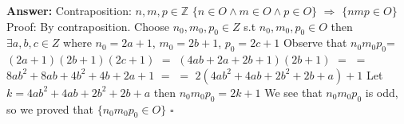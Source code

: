 \documentclass[12pt]{article}
\begin{document}
{\noindent\bf Answer:}
{
Contraposition: $n,m,p\in\mathbb{Z}$  $\{n \in O \land m \in O \land p \in O\}$ $\Rightarrow$  $\{nmp\in O\}$ \newline
Proof: By contraposition. Choose $n_{0},m_{0},p_{0} \in Z $ \newline
s.t $n_{0},m_{0},p_{0} \in O $\newline
then $\exists a,b,c \in Z$ where $n_{0}=2a+1$, $m_{0}=2b+1$, $p_{0}=2c+1$\newline
Observe that  $n_{0}m_{0}p_{0}$=$(2a+1)(2b+1)(2c+1)$ \newline
              $=$ $(4ab+2a+2b+1)(2b+1) $ $=$\newline
              $=$ $8ab^{2}+8ab+4b^{2}+4b+2a+1$ $=$\newline
              $=$ $2(4ab^{2}+4ab+2b^{2}+2b+a)+1$\newline
Let $k=4ab^{2}+4ab+2b^{2}+2b+a $ then $n_{0}m_{0}p_{0}=2k+1$\newline
We see that $n_{0}m_{0}p_{0}$ is odd, so we proved that $\{n_{0}m_{0}p_{0}\in O\}$ $\square$\newline
}
\end{document}
